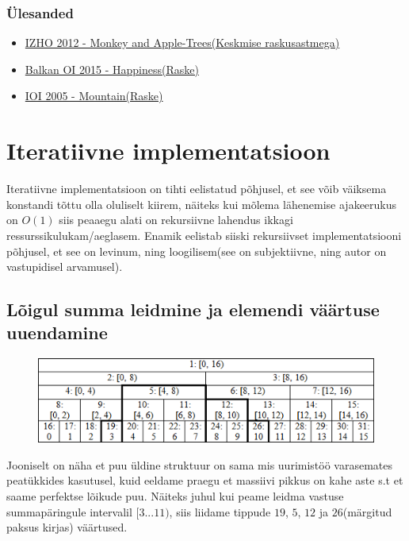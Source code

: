 \documentclass{trkut}
\theoremstyle{definition}
\begin{document}
\subsubsection{Ülesanded}
\begin{itemize}
    \item \href{https://oj.uz/problem/view/IZhO12_apple}{IZHO 2012 - Monkey and Apple-Trees(Keskmise raskusastmega)}
    \item \href{https://oj.uz/problem/view/Balkan15_HAPPINESS}{Balkan OI 2015 - Happiness(Raske)}
    \item \href{https://dmoj.ca/problem/ioi05p3}{IOI 2005 - Mountain(Raske)}
\end{itemize}
\section{Iteratiivne implementatsioon} 
Iteratiivne implementatsioon on tihti eelistatud põhjusel, et see võib väiksema konstandi tõttu olla oluliselt kiirem, näiteks kui mõlema lähenemise ajakeerukus on $O(1)$ siis peaaegu alati on rekursiivne lahendus ikkagi ressurssikulukam/aeglasem.
Enamik eelistab siiski rekursiivset implementatsiooni põhjusel, et see on levinum, ning loogilisem(see on subjektiivne, ning autor on vastupidisel arvamusel).

\subsection{Lõigul summa leidmine ja elemendi väärtuse uuendamine}

\begin{figure}[H]%
    \includegraphics[width=12cm]{LIHTPUU.png}%
    \caption{}%
    \label{joonis}%
\end{figure}
Jooniselt on näha et puu üldine struktuur on sama mis uurimistöö varasemates peatükkides kasutusel, kuid eeldame praegu et massiivi pikkus on kahe aste s.t et saame perfektse lõikude puu. Näiteks juhul kui peame leidma vastuse summapäringule intervalil $[3...11)$, siis liidame tippude $19$, $5$, $12$ ja $26$(märgitud paksus kirjas) väärtused. \parencite{cfpuu}
\end{document}
